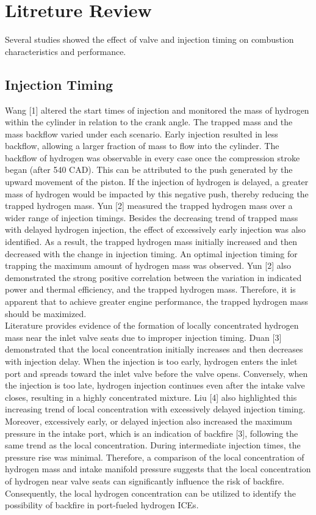 \documentclass[conference]{IEEEtran}
\begin{document}
\section{Litreture Review}

Several studies showed the effect of valve and injection timing on combustion characteristics and performance.  

\subsection{Injection Timing}

Wang [1] altered the start times of injection and monitored the mass of hydrogen within the cylinder in relation to the crank angle. The trapped mass and the mass backflow varied under each scenario. Early injection resulted in less backflow, allowing a larger fraction of mass to flow into the cylinder. The backflow of hydrogen was observable in every case once the compression stroke began (after 540 CAD). This can be attributed to the push generated by the upward movement of the piston. If the injection of hydrogen is delayed, a greater mass of hydrogen would be impacted by this negative push, thereby reducing the trapped hydrogen mass. Yun [2] measured the trapped hydrogen mass over a wider range of injection timings. Besides the decreasing trend of trapped mass with delayed hydrogen injection, the effect of excessively early injection was also identified. As a result, the trapped hydrogen mass initially increased and then decreased with the change in injection timing. An optimal injection timing for trapping the maximum amount of hydrogen mass was observed. Yun [2] also demonstrated the strong positive correlation between the variation in indicated power and thermal efficiency, and the trapped hydrogen mass. Therefore, it is apparent that to achieve greater engine performance, the trapped hydrogen mass should be maximized.\\

Literature provides evidence of the formation of locally concentrated hydrogen mass near the inlet valve seats due to improper injection timing. Duan [3] demonstrated that the local concentration initially increases and then decreases with injection delay. When the injection is too early, hydrogen enters the inlet port and spreads toward the inlet valve before the valve opens. Conversely, when the injection is too late, hydrogen injection continues even after the intake valve closes, resulting in a highly concentrated mixture. Liu [4] also highlighted this increasing trend of local concentration with excessively delayed injection timing. Moreover, excessively early, or delayed injection also increased the maximum pressure in the intake port, which is an indication of backfire [3], following the same trend as the local concentration. During intermediate injection times, the pressure rise was minimal. Therefore, a comparison of the local concentration of hydrogen mass and intake manifold pressure suggests that the local concentration of hydrogen near valve seats can significantly influence the risk of backfire. Consequently, the local hydrogen concentration can be utilized to identify the possibility of backfire in port-fueled hydrogen ICEs.
\end{document}

